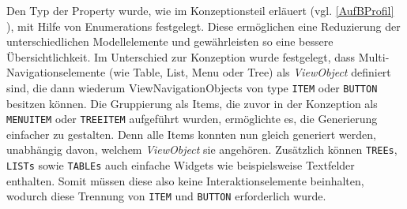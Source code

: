 Den Typ der Property wurde, wie im Konzeptionsteil erläuert (vgl. \ref{AufBProfil} ), mit Hilfe von Enumerations festgelegt. Diese ermöglichen eine Reduzierung der unterschiedlichen Modellelemente und gewährleisten so eine bessere Übersichtlichkeit. Im Unterschied zur Konzeption wurde festgelegt, dass Multi-Navigationselemente (wie Table, List, Menu oder Tree) als  \textit{ViewObject} definiert sind, die dann wiederum ViewNavigationObjects von type  \texttt{ITEM} oder \texttt{BUTTON} besitzen können. Die Gruppierung als Items, die zuvor in der Konzeption als \texttt{MENUITEM} oder \texttt{TREEITEM} aufgeführt wurden, ermöglichte es, die Generierung einfacher zu gestalten. Denn alle Items konnten nun gleich generiert werden, unabhängig davon, welchem  \textit{ViewObject} sie angehören. Zusätzlich können \texttt{TREEs}, \texttt{LISTs} sowie \texttt{TABLEs} auch einfache Widgets wie beispielsweise Textfelder enthalten. Somit müssen diese also keine Interaktionselemente beinhalten, wodurch diese Trennung von \texttt{ITEM} und \texttt{BUTTON} erforderlich wurde.\\

